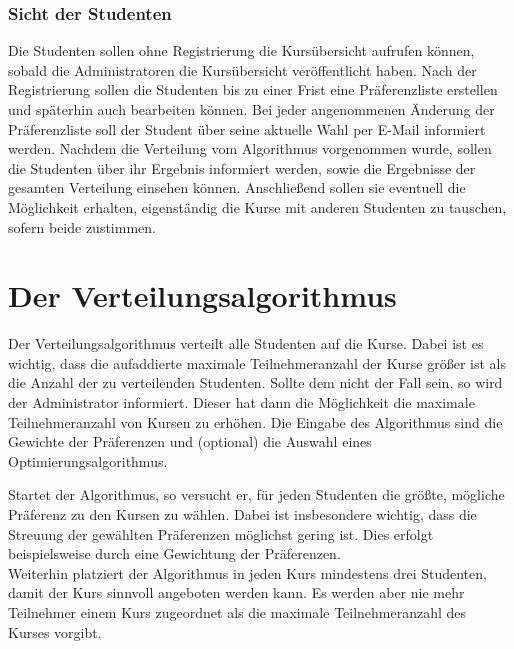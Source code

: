 		
		
			\subsubsection{Sicht der Studenten}
				Die Studenten sollen ohne Registrierung die Kursübersicht aufrufen können, sobald die Administratoren die Kursübersicht veröffentlicht haben.
				Nach der Registrierung sollen die Studenten bis zu einer Frist eine Präferenzliste erstellen und späterhin auch bearbeiten können.
				Bei jeder angenommenen Änderung der Präferenzliste soll der Student über seine aktuelle Wahl per E-Mail informiert werden.
				Nachdem die Verteilung vom Algorithmus vorgenommen wurde, sollen die Studenten über ihr Ergebnis informiert werden, sowie die Ergebnisse der gesamten Verteilung einsehen können.
				Anschließend sollen sie eventuell die Möglichkeit erhalten, eigenständig die Kurse mit anderen Studenten zu tauschen, sofern beide zustimmen.
				
				
	
	
	
	\section{Der Verteilungsalgorithmus}
		Der Verteilungsalgorithmus verteilt alle Studenten auf die Kurse.
		Dabei ist es wichtig, dass die aufaddierte maximale Teilnehmeranzahl der Kurse größer ist als die Anzahl der zu verteilenden Studenten.
		Sollte dem nicht der Fall sein, so wird der Administrator informiert.
		Dieser hat dann die Möglichkeit die maximale Teilnehmeranzahl von Kursen zu erhöhen.
		Die Eingabe des Algorithmus sind die Gewichte der Präferenzen und (optional) die Auswahl eines Optimierungsalgorithmus.
		
		Startet der Algorithmus, so versucht er, für jeden Studenten die größte, mögliche Präferenz zu den Kursen zu wählen.
		Dabei ist insbesondere wichtig, dass die Streuung der gewählten Präferenzen möglichst gering ist.
		Dies erfolgt beispielsweise durch eine Gewichtung der Präferenzen.\\
		Weiterhin platziert der Algorithmus in jeden Kurs mindestens drei Studenten, damit der Kurs sinnvoll angeboten werden kann.
		Es werden aber nie mehr Teilnehmer einem Kurs zugeordnet als die maximale Teilnehmeranzahl des Kurses vorgibt.
		
